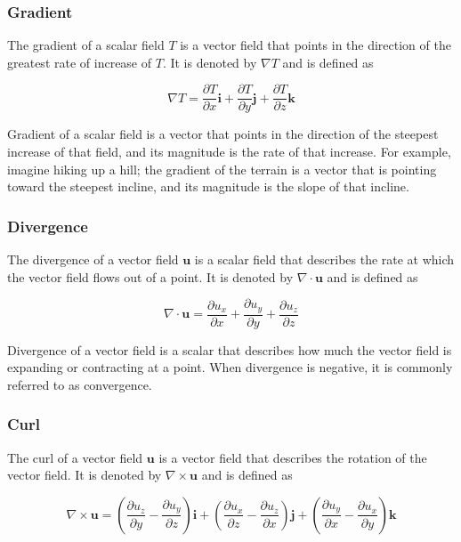\documentclass[12pt]{article}
\numberwithin{equation}{section}
\numberwithin{figure}{section}
\numberwithin{table}{section}
\begin{document}
\subsubsection{Gradient}

The gradient of a scalar field $T$ is a vector field that points in the
direction of the greatest rate of increase of $T$.
It is denoted by $\nabla T$ and is defined as

\begin{equation}
  \nabla T = \frac{\partial T}{\partial x} \mathbf{i} +
    \frac{\partial T}{\partial y} \mathbf{j} +
    \frac{\partial T}{\partial z} \mathbf{k}
\end{equation}

Gradient of a scalar field is a vector that points in the direction of the
steepest increase of that field, and its magnitude is the rate of that increase.
For example, imagine hiking up a hill; the gradient of the terrain is a vector
that is pointing toward the steepest incline, and its magnitude is the slope
of that incline.

\subsubsection{Divergence}

The divergence of a vector field $\mathbf{u}$ is a scalar field that describes
the rate at which the vector field flows out of a point.
It is denoted by $\nabla \cdot \mathbf{u}$ and is defined as

\begin{equation}
  \label{eq:divergence}
  \nabla \cdot \mathbf{u} = \frac{\partial u_x}{\partial x} +
    \frac{\partial u_y}{\partial y} + \frac{\partial u_z}{\partial z}
\end{equation}

Divergence of a vector field is a scalar that describes how much the vector
field is expanding or contracting at a point.
When divergence is negative, it is commonly referred to as convergence.

\subsubsection{Curl}

The curl of a vector field $\mathbf{u}$ is a vector field that describes the
rotation of the vector field.
It is denoted by $\nabla \times \mathbf{u}$ and is defined as

\begin{equation}
  \nabla \times \mathbf{u} = \left( \frac{\partial u_z}{\partial y} -
    \frac{\partial u_y}{\partial z} \right) \mathbf{i} +
    \left( \frac{\partial u_x}{\partial z} -
    \frac{\partial u_z}{\partial x} \right) \mathbf{j} +
    \left( \frac{\partial u_y}{\partial x} -
    \frac{\partial u_x}{\partial y} \right) \mathbf{k}
\end{equation}
\end{document}
